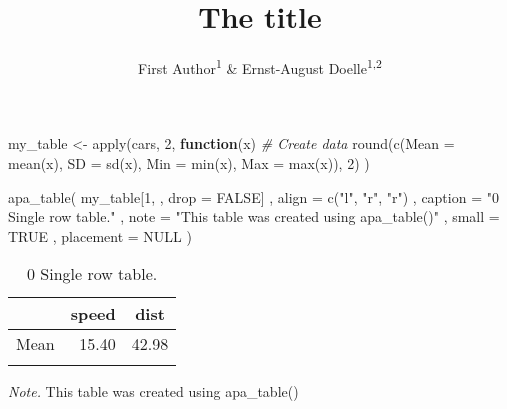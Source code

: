 \documentclass[
  man,floatsintext]{apa6}
\title{The title}
\author{First Author\textsuperscript{1} \& Ernst-August Doelle\textsuperscript{1,2}}
\date{}
\affiliation{\vspace{0.5cm}\textsuperscript{1} Wilhelm-Wundt-University\\\textsuperscript{2} Konstanz Business School}
\newenvironment{Shaded}{\begin{snugshade}}{\end{snugshade}}
\newcommand{\AttributeTok}[1]{\textcolor[rgb]{0.77,0.63,0.00}{#1}}
\newcommand{\CommentTok}[1]{\textcolor[rgb]{0.56,0.35,0.01}{\textit{#1}}}
\newcommand{\ConstantTok}[1]{\textcolor[rgb]{0.00,0.00,0.00}{#1}}
\newcommand{\ControlFlowTok}[1]{\textcolor[rgb]{0.13,0.29,0.53}{\textbf{#1}}}
\newcommand{\DecValTok}[1]{\textcolor[rgb]{0.00,0.00,0.81}{#1}}
\newcommand{\FunctionTok}[1]{\textcolor[rgb]{0.00,0.00,0.00}{#1}}
\newcommand{\NormalTok}[1]{#1}
\newcommand{\OtherTok}[1]{\textcolor[rgb]{0.56,0.35,0.01}{#1}}
\newcommand{\StringTok}[1]{\textcolor[rgb]{0.31,0.60,0.02}{#1}}
\begin{document}
\maketitle

\begin{Shaded}
\begin{Highlighting}[]
\NormalTok{my\_table }\OtherTok{\textless{}{-}} \FunctionTok{apply}\NormalTok{(cars, }\DecValTok{2}\NormalTok{, }\ControlFlowTok{function}\NormalTok{(x) }\CommentTok{\# Create data}
  \FunctionTok{round}\NormalTok{(}\FunctionTok{c}\NormalTok{(}\AttributeTok{Mean =} \FunctionTok{mean}\NormalTok{(x), }\AttributeTok{SD =} \FunctionTok{sd}\NormalTok{(x), }\AttributeTok{Min =} \FunctionTok{min}\NormalTok{(x), }\AttributeTok{Max =} \FunctionTok{max}\NormalTok{(x)), }\DecValTok{2}\NormalTok{)}
\NormalTok{)}

\FunctionTok{apa\_table}\NormalTok{(}
\NormalTok{  my\_table[}\DecValTok{1}\NormalTok{, , }\AttributeTok{drop =} \ConstantTok{FALSE}\NormalTok{]}
\NormalTok{  , }\AttributeTok{align =} \FunctionTok{c}\NormalTok{(}\StringTok{"l"}\NormalTok{, }\StringTok{"r"}\NormalTok{, }\StringTok{"r"}\NormalTok{)}
\NormalTok{  , }\AttributeTok{caption =} \StringTok{"0 Single row table."}
\NormalTok{  , }\AttributeTok{note =} \StringTok{"This table was created using apa\_table()"}
\NormalTok{  , }\AttributeTok{small =} \ConstantTok{TRUE}
\NormalTok{  , }\AttributeTok{placement =} \ConstantTok{NULL}
\NormalTok{)}
\end{Highlighting}
\end{Shaded}

\begin{table}

\begin{center}
\begin{threeparttable}

\caption{\label{tab:unnamed-chunk-2}0 Single row table.}

\small{

\begin{tabular}{lrr}
\toprule
 & \multicolumn{1}{c}{speed} & \multicolumn{1}{c}{dist}\\
\midrule
Mean & 15.40 & 42.98\\
\bottomrule
\addlinespace
\end{tabular}

}

\begin{tablenotes}[para]
\normalsize{\textit{Note.} This table was created using apa\_table()}
\end{tablenotes}

\end{threeparttable}
\end{center}

\end{table}
\end{document}
